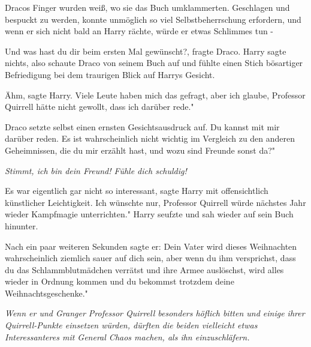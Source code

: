 Dracos Finger wurden weiß, wo sie das Buch umklammerten. Geschlagen und bespuckt
zu werden, konnte unmöglich so viel Selbstbeherrschung erfordern, und wenn er
sich nicht bald an Harry rächte, würde er etwas Schlimmes tun -

\glqq Und was hast du dir beim ersten Mal gewünscht?\grqq{}, fragte Draco. Harry
sagte nichts, also schaute Draco von seinem Buch auf und fühlte einen Stich
bösartiger Befriedigung bei dem traurigen Blick auf Harrys Gesicht.

\glqq Ähm\grqq{}, sagte Harry. \glqq Viele Leute haben mich das gefragt, aber
ich glaube, Professor Quirrell hätte nicht gewollt, dass ich darüber rede."

Draco setzte selbst einen ernsten Gesichtsausdruck auf. \glqq Du kannst mit mir
darüber reden. Es ist wahrscheinlich nicht wichtig im Vergleich zu den anderen
Geheimnissen, die du mir erzählt hast, und wozu sind Freunde sonst da?"

\emph{ Stimmt, ich bin dein Freund! Fühle dich schuldig!}

\glqq Es war eigentlich gar nicht so interessant\grqq{}, sagte Harry mit
offensichtlich künstlicher Leichtigkeit. \glqq Ich wünschte nur, Professor
Quirrell würde nächstes Jahr wieder Kampfmagie unterrichten." Harry seufzte und
sah wieder auf sein Buch hinunter.

Nach ein paar weiteren Sekunden sagte er: \glqq Dein Vater wird dieses
Weihnachten wahrscheinlich ziemlich sauer auf dich sein, aber wenn du ihm
versprichst, dass du das Schlammblutmädchen verrätst und ihre Armee auslöschst,
wird alles wieder in Ordnung kommen und du bekommst trotzdem deine
Weihnachtsgeschenke."

\emph{ Wenn er und Granger Professor Quirrell besonders höflich bitten und einige ihrer Quirrell-Punkte einsetzen würden, dürften die beiden vielleicht etwas Interessanteres mit General Chaos machen, als ihn einzuschläfern. }

